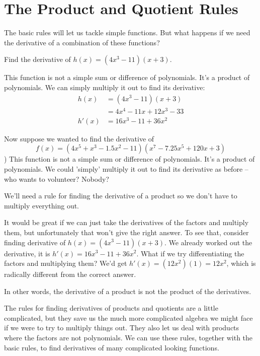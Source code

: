 \section{The Product and Quotient Rules}
\label{sec:prod-quot}


The basic rules will let us tackle simple functions. But what happens if we need the derivative of a combination of these functions?

\begin{example}
  \label{ex:2-8-1}
Find the derivative of $h(x)=(4x^3-11)(x+3)$.

\begin{solution} This function is not a simple sum or difference of polynomials. It's a product of polynomials. We can simply multiply it out to find its derivative:
\begin{align*}
		h(x) &= \left(4x^3-11\right)(x+3)\\
		 &= 4x^4-11x+12x^3-33\\
		h'(x) &= 16x^3-11+36x^2
	\end{align*}
\end{solution}\end{example}

Now suppose we wanted to find the derivative of
$$f(x)=\left(4x^5+x^3-1.5x^2-11\right)\left(x^7-7.25x^5+120x+3\right)$$)
This function is not a simple sum or difference of polynomials. It's a product of polynomials. We could 'simply' multiply it out to find its derivative as before -- who wants to volunteer? Nobody?

We'll need a rule for finding the derivative of a product so we don't have to multiply everything out.

It would be great if we can just take the derivatives of the factors and multiply them, but unfortunately that won't give the right answer. To see that, consider finding derivative of $h(x)=(4x^3-11)(x+3)$. We already worked out the derivative, it is $h'(x)=16x^3-11+36x^2$. What if we try differentiating the factors and multiplying them? We'd get $h'(x)=(12x^2)(1)=12x^2$, which is radically different from the correct answer.

In other words, the derivative of a product is not the product of the derivatives.

The rules for finding derivatives of products and quotients are a little complicated, but they save us the much more complicated algebra we might face if we were to try to multiply things out. They also let us deal with products where the factors are not polynomials. We can use these rules, together with the basic rules, to find derivatives of many complicated looking functions.

